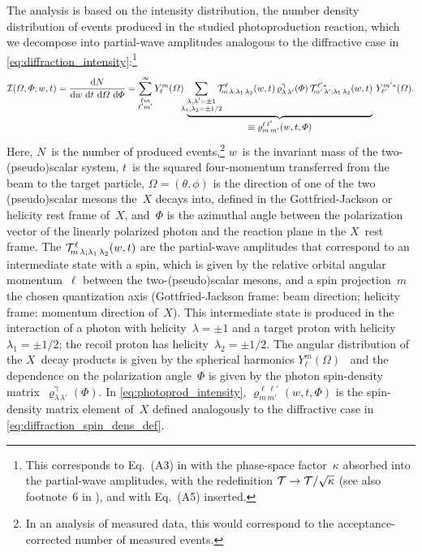The analysis is based on the intensity distribution, \ie the number
density distribution of events produced in the studied photoproduction
reaction, which we decompose into partial-wave amplitudes analogous to
the diffractive case in
\cref{eq:diffraction_intensity}:\footnote{\label{fn:photoprod_ampl_redef}This
corresponds to Eq.~(A3) in  with the
phase-space factor~$\kappa$ absorbed into the partial-wave amplitudes,
\ie with the redefinition $\mathcal{T} \to \mathcal{T} / \sqrt{\kappa}$ (see
also footnote~6 in ), and with Eq.~(A5)
inserted.}
\begin{equation}
  \label{eq:photoprod_intensity}
  \intensity(\Omega, \Phi; w, t)
  = \frac{\dif{N}}{\dif{w}\, \dif{t}\, \dif{\Omega}\, \dif{\Phi}}
  = \sum_{\substack{\ell m \\ \ell' m'}}^\infty
  Y_\ell^m(\Omega)~
  \dUnderbrace{\sum_{\substack{\lambda, \lambda' = \pm 1 \\ \mathclap{\lambda_1, \lambda_2 = \pm 1/2}}}
  \prodAmp^\ell_{\!m\, \lambda; \lambda_1\, \lambda_2}(w, t)\,
  \varrho^\gamma_{\lambda\, \lambda'}(\Phi)\,
  \prodAmp^{\ell' *}_{\!m'\, \lambda'; \lambda_1\, \lambda_2}(w, t)}{\equiv \varrho^{\ell\, \ell'}_{m\, m'}(w, t, \Phi)}~
  Y_{\ell'}^{m' *}(\Omega).
\end{equation}
Here, $N$~is the number of produced events,\footnote{In an analysis of
measured data, this would correspond to the acceptance-corrected
number of measured events.} $w$~is the invariant mass of the
two-(pseudo)scalar system, $t$~is the squared four-momentum
transferred from the beam to the target particle, $\Omega = (\theta,
\phi)$ is the direction of one of the two (pseudo)scalar mesons
the~$X$ decays into, defined in the Gottfried-Jackson or helicity rest
frame of~$X$, and~$\Phi$ is the azimuthal angle between the
polarization vector of the linearly polarized photon and the reaction
plane in the $X$~rest frame.  The $\mathcal{T}^\ell_{\!m\, \lambda;
\lambda_1\, \lambda_2}(w, t)$ are the partial-wave amplitudes that
correspond to an intermediate state with a spin, which is given by the
relative orbital angular momentum~$\ell$ between the
two-(pseudo)scalar mesons, and a spin projection~$m$ \wrt the chosen
quantization axis (Gottfried-Jackson frame: beam direction; helicity
frame: momentum direction of~$X$).  This intermediate state is
produced in the interaction of a photon with helicity~$\lambda = \pm
1$ and a target proton with helicity~$\lambda_1 = \pm 1/2$; the recoil
proton has helicity~$\lambda_2 = \pm 1/2$.  The angular distribution
of the $X$~decay products is given by the spherical harmonics
$Y_\ell^m(\Omega)$~\cite{wikipedia:sphericalHarm} and the dependence
on the polarization angle~$\Phi$ is given by the photon spin-density
matrix~$\varrho^\gamma_{\lambda\, \lambda'}(\Phi)$.  In
\cref{eq:photoprod_intensity}, $\varrho^{\ell\, \ell'}_{m\, m'}(w, t,
\Phi)$ is the spin-density matrix element of~$X$ defined analogously
to the diffractive case in \cref{eq:diffraction_spin_dens_def}.

